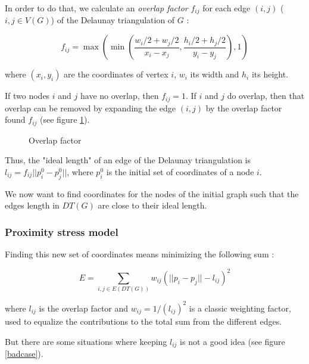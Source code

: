 \documentclass[12pt]{report}
\begin{document}
\bigskip
In order to do that, we calculate an \emph{overlap factor} $f_{ij}$ for each edge $(i,j)$ ($i,j \in V(G)$) of the Delaunay triangulation of $G$ :

\[ f_{ij} = \max \left( \min \left(\frac{w_i/2 + w_j/2}{x_i - x_j}, 
\frac{h_i/2 + h_j/2}{y_i - y_j} \right), 1 \right) \label{of}\]

where $(x_i,y_i)$ are the coordinates of vertex $i$, $w_i$ its width and $h_i$ its height.

If two nodes $i$ and $j$ have no overlap, then $f_{ij} = 1$. 
If $i$ and $j$ do overlap, then that overlap can be removed by expanding the edge $(i,j)$ by the overlap factor found $f_{ij}$ (see figure \ref{overlapFactor}). 

\begin{figure}[h]
	\center
  \setlength\fboxsep{5pt}
  \setlength\fboxrule{0.5pt}
  \caption{Overlap factor}
  \label{overlapFactor}
\end{figure}

Thus, the "ideal length" of an edge of the Delaunay triangulation is $l_{ij} = f_{ij}||p_i^0 - p_j^0||$, where $p_i^0$ is the initial set of coordinates of a node $i$.

We now want to find coordinates for the nodes of the initial graph such that the edges length in $DT(G)$ are close to their ideal length.

\subsubsection{Proximity stress model}

Finding this new set of coordinates means minimizing the following sum :

\[ E = \sum_{i,j \in E(DT(G))} w_{ij}(||p_i - p_j|| - l_{ij})^2\]

where $l_{ij}$ is the overlap factor and $w_{ij} = 1/(l_{ij})^2$ is a classic weighting factor, used to equalize the contributions to the total sum from the different edges.


But there are some situations where keeping $l_{ij}$ is not a good idea (see figure \ref{badcase}).
\end{document}
